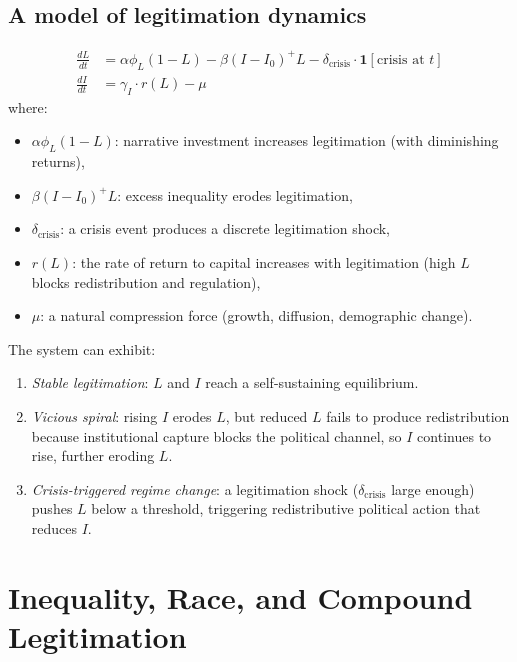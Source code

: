 \subsection{A model of legitimation dynamics}

\begin{model}
\label{mod:legitimation-dynamics}
\begin{align}
  \frac{dL}{dt} &= \alpha \phi_L (1 - L) - \beta (I - I_0)^+ L - \delta_{\text{crisis}} \cdot \mathbf{1}[\text{crisis at } t] \label{eq:legit-dynamics} \\
  \frac{dI}{dt} &= \gamma_I \cdot r(L) - \mu \label{eq:ineq-dynamics}
\end{align}
where:
\begin{itemize}[nosep]
  \item $\alpha \phi_L (1-L)$: narrative investment increases legitimation (with diminishing returns),
  \item $\beta(I - I_0)^+ L$: excess inequality erodes legitimation,
  \item $\delta_{\text{crisis}}$: a crisis event produces a discrete legitimation shock,
  \item $r(L)$: the rate of return to capital increases with legitimation (high $L$ blocks redistribution and regulation),
  \item $\mu$: a natural compression force (growth, diffusion, demographic change).
\end{itemize}
The system can exhibit:
\begin{enumerate}[nosep]
  \item \emph{Stable legitimation}: $L$ and $I$ reach a self-sustaining equilibrium.
  \item \emph{Vicious spiral}: rising $I$ erodes $L$, but reduced $L$ fails to produce redistribution because institutional capture blocks the political channel, so $I$ continues to rise, further eroding $L$.
  \item \emph{Crisis-triggered regime change}: a legitimation shock ($\delta_{\text{crisis}}$ large enough) pushes $L$ below a threshold, triggering redistributive political action that reduces $I$.
\end{enumerate}
\end{model}

\section{Inequality, Race, and Compound Legitimation}
\label{sec:ch24-race}

